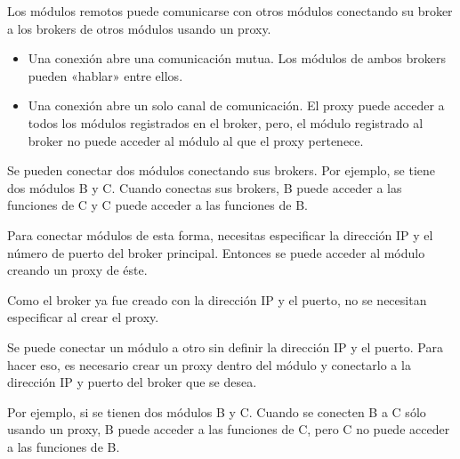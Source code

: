 Los módulos remotos puede comunicarse con otros módulos conectando su broker
a los brokers de otros módulos usando un proxy.
\begin{itemize}
\item {} 
Una conexión  abre una comunicación mutua. Los módulos de ambos brokers pueden «hablar» entre ellos.

\item {} 
Una conexión  abre un solo canal de comunicación. El proxy puede acceder a todos los módulos registrados en el broker, pero, el módulo registrado al broker no puede acceder al módulo al que el proxy pertenece.

\end{itemize}


Se pueden conectar dos módulos conectando sus brokers.
Por ejemplo, se tiene dos módulos B y C. Cuando conectas sus brokers, B puede
acceder  a las funciones de C y C puede acceder a las funciones de B.

Para conectar módulos de esta forma, necesitas especificar la dirección IP y el
número de puerto del broker principal. Entonces se puede acceder al módulo
creando un proxy de éste.

Como el broker ya fue creado con la dirección IP y el puerto, no se necesitan
especificar al crear el proxy.


Se puede conectar un módulo a otro sin definir la dirección IP y el puerto.
Para hacer eso, es necesario crear un proxy dentro del módulo y conectarlo
a la dirección IP y puerto del broker que se desea.

Por ejemplo, si se tienen dos módulos B y C. Cuando se conecten B a C sólo
usando un proxy, B puede acceder a las funciones de C, pero C no puede acceder
a las funciones de B.


